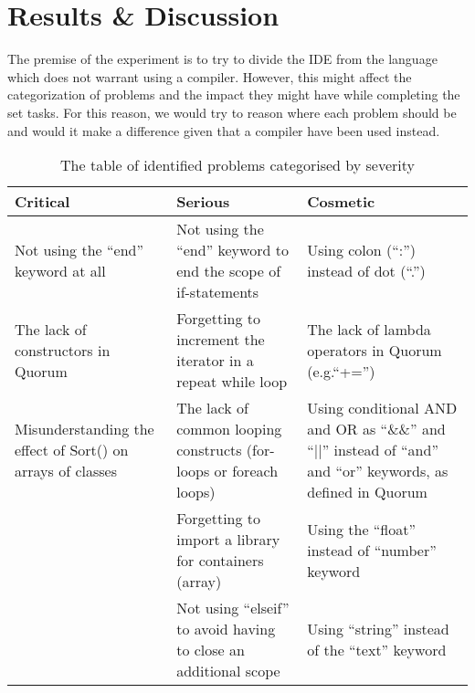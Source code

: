 \chapter{Results \& Discussion}



The premise of the experiment is to try to divide the IDE from the language which does not warrant using a compiler. However, this might affect the categorization of problems and the impact they might have while completing the set tasks. For this reason, we would try to reason where each problem should be and would it make a difference given that a compiler have been used instead.

\begin{table}[]
\centering
\renewcommand{\arraystretch}{1.5}
\caption{The table of identified problems categorised by severity}
\label{QuorumProblemResult}
\begin{tabular}{| p{5cm} | p{5cm} | p{5cm} |}
\hline
\textbf{Critical}                                          & \textbf{Serious}                                                   & \textbf{Cosmetic}                                                                                        \\ \hline
Not using the “end” keyword at all                         & Not using the “end” keyword to end the scope of if-statements      & Using colon (“:”) instead of dot (“.”)                                                                   \\ \hline
The lack of constructors in Quorum                         & Forgetting to increment the iterator in a repeat while loop        & The lack of lambda operators in Quorum (e.g.“+=”)                                                        \\ \hline
Misunderstanding the effect of Sort() on arrays of classes & The lack of common looping constructs (for-loops or foreach loops) & Using conditional AND and OR as “\&\&” and “||” instead of “and” and “or” keywords, as defined in Quorum \\ \hline
                                                           & Forgetting to import a library for containers (array)              & Using the “float” instead of “number” keyword                                                            \\ \hline
                                                           & Not using “elseif” to avoid having to close an additional scope    & Using “string” instead of the “text” keyword                                                             \\ \hline

\end{tabular}
\end{table}
